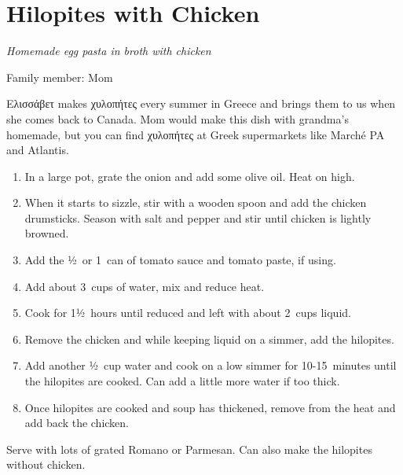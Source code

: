 \chapter{Hilopites with Chicken}
\label{ch:hilopites}


\textit{Homemade egg pasta in broth with chicken}

Family member: Mom

 \textgreek{Ελισσάβετ} makes \textgreek{χυλοπήτες} every summer in Greece and brings them to us when she comes back to Canada. Mom would make this dish with grandma's homemade, but you can find \textgreek{χυλοπήτες} at Greek supermarkets like Marché PA and Atlantis.

\begin{enumerate}
    \item In a large pot, grate the onion and add some olive oil. Heat on high.
    \item When it starts to sizzle, stir with a wooden spoon and add the chicken drumsticks. Season with salt and pepper and stir until chicken is lightly browned.
    \item Add the ½~or 1~can of tomato sauce and tomato paste, if using.
    \item Add about 3~cups of water, mix and reduce heat.
    \item Cook for 1½~hours until reduced and left with about 2~cups liquid.
    \item Remove the chicken and while keeping liquid on a simmer, add the hilopites.
    \item Add another ½~cup water and cook on a low simmer for 10-15~minutes until the hilopites are cooked. Can add a little more water if too thick.
    \item Once hilopites are cooked and soup has thickened, remove from the heat and add back the chicken.
\end{enumerate}

Serve with lots of grated Romano or Parmesan. Can also make the hilopites without chicken.
